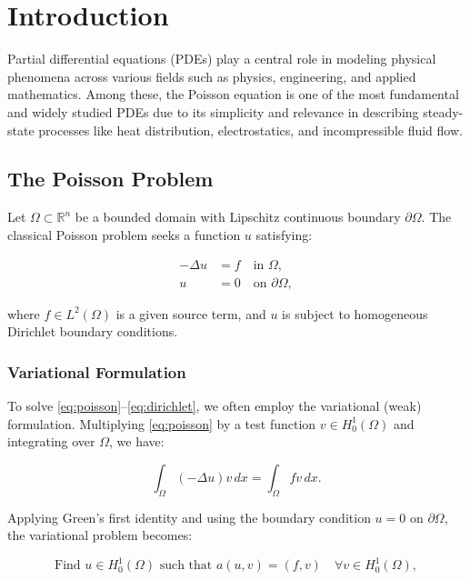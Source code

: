 \documentclass[class=article, crop=false]{standalone}
\begin{document}
\section{Introduction}

Partial differential equations (PDEs) play a central role in modeling physical phenomena across various fields such as physics, engineering, and applied mathematics. Among these, the Poisson equation is one of the most fundamental and widely studied PDEs due to its simplicity and relevance in describing steady-state processes like heat distribution, electrostatics, and incompressible fluid flow.

\subsection{The Poisson Problem}

Let $\Omega \subset \mathbb{R}^n$ be a bounded domain with Lipschitz continuous boundary $\partial \Omega$. The classical Poisson problem seeks a function $u$ satisfying:

\begin{align}
    -\Delta u &= f \quad \text{in } \Omega, \label{eq:poisson}\\
    u &= 0 \quad \text{on } \partial \Omega, \label{eq:dirichlet}
\end{align}

where $f \in L^2(\Omega)$ is a given source term, and $u$ is subject to homogeneous Dirichlet boundary conditions.

\subsubsection{Variational Formulation}

To solve \eqref{eq:poisson}--\eqref{eq:dirichlet}, we often employ the variational (weak) formulation. Multiplying \eqref{eq:poisson} by a test function $v \in H_0^1(\Omega)$ and integrating over $\Omega$, we have:

\[
\int_\Omega (-\Delta u) v \, dx = \int_\Omega f v \, dx.
\]

Applying Green's first identity and using the boundary condition $u = 0$ on $\partial \Omega$, the variational problem becomes:

\begin{equation}
\text{Find } u \in H_0^1(\Omega) \text{ such that } a(u, v) = (f, v) \quad \forall v \in H_0^1(\Omega), \label{eq:variational}
\end{equation}
\end{document}
